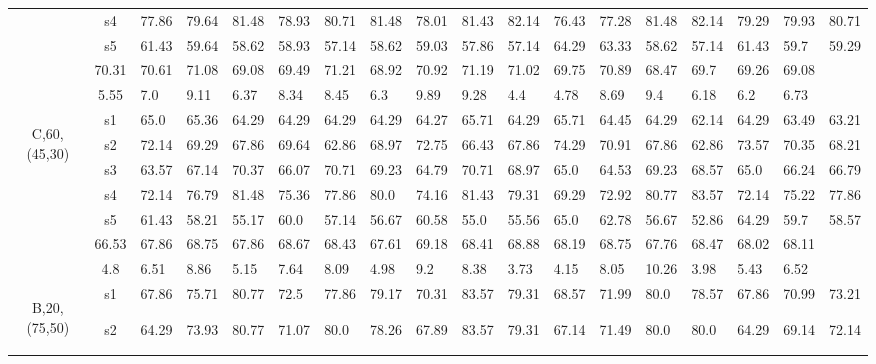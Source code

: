 \begin{table}[h]
{\begin{tabular}{cc|llll|llll|llll|llll}
 & s4 & 77.86 & 79.64 & 81.48 & 78.93 & 80.71 & 81.48 & 78.01 & 81.43 & 82.14 & 76.43 & 77.28 & 81.48 & 82.14 & 79.29 & 79.93 & 80.71 \\
 & s5 & 61.43 & 59.64 & 58.62 & 58.93 & 57.14 & 58.62 & 59.03 & 57.86 & 57.14 & 64.29 & 63.33 & 58.62 & 57.14 & 61.43 & 59.7 & 59.29 \\
\rowcolor{lightgray!50}\multicolumn{2}{r|}{avg} & 70.31 & 70.61 & 71.08 & 69.08 & 69.49 & 71.21 & 68.92 & 70.92 & 71.19 & 71.02 & 69.75 & 70.89 & 68.47 & 69.7 & 69.26 & 69.08 \\
\rowcolor{lightgray!50}\multicolumn{2}{r|}{std} & 5.55 & 7.0 & 9.11 & 6.37 & 8.34 & 8.45 & 6.3 & 9.89 & 9.28 & 4.4 & 4.78 & 8.69 & 9.4 & 6.18 & 6.2 & 6.73 \\
\multirow{6}{*}{\begin{sideways}C,60,(45,30)\end{sideways}} & s1 & 65.0 & 65.36 & 64.29 & 64.29 & 64.29 & 64.29 & 64.27 & 65.71 & 64.29 & 65.71 & 64.45 & 64.29 & 62.14 & 64.29 & 63.49 & 63.21 \\
 & s2 & 72.14 & 69.29 & 67.86 & 69.64 & 62.86 & 68.97 & 72.75 & 66.43 & 67.86 & 74.29 & 70.91 & 67.86 & 62.86 & 73.57 & 70.35 & 68.21 \\
 & s3 & 63.57 & 67.14 & 70.37 & 66.07 & 70.71 & 69.23 & 64.79 & 70.71 & 68.97 & 65.0 & 64.53 & 69.23 & 68.57 & 65.0 & 66.24 & 66.79 \\
 & s4 & 72.14 & 76.79 & 81.48 & 75.36 & 77.86 & 80.0 & 74.16 & 81.43 & 79.31 & 69.29 & 72.92 & 80.77 & 83.57 & 72.14 & 75.22 & 77.86 \\
 & s5 & 61.43 & 58.21 & 55.17 & 60.0 & 57.14 & 56.67 & 60.58 & 55.0 & 55.56 & 65.0 & 62.78 & 56.67 & 52.86 & 64.29 & 59.7 & 58.57 \\
\rowcolor{lightgray!50}\multicolumn{2}{r|}{avg} & 66.53 & 67.86 & 68.75 & 67.86 & 68.67 & 68.43 & 67.61 & 69.18 & 68.41 & 68.88 & 68.19 & 68.75 & 67.76 & 68.47 & 68.02 & 68.11 \\
\rowcolor{lightgray!50}\multicolumn{2}{r|}{std} & 4.8 & 6.51 & 8.86 & 5.15 & 7.64 & 8.09 & 4.98 & 9.2 & 8.38 & 3.73 & 4.15 & 8.05 & 10.26 & 3.98 & 5.43 & 6.52 \\
\multirow{6}{*}{\begin{sideways}B,20,(75,50)\end{sideways}} & s1 & 67.86 & 75.71 & 80.77 & 72.5 & 77.86 & 79.17 & 70.31 & 83.57 & 79.31 & 68.57 & 71.99 & 80.0 & 78.57 & 67.86 & 70.99 & 73.21 \\
 & s2 & 64.29 & 73.93 & 80.77 & 71.07 & 80.0 & 78.26 & 67.89 & 83.57 & 79.31 & 67.14 & 71.49 & 80.0 & 80.0 & 64.29 & 69.14 & 72.14 \\

\end{tabular}}
\end{table}
